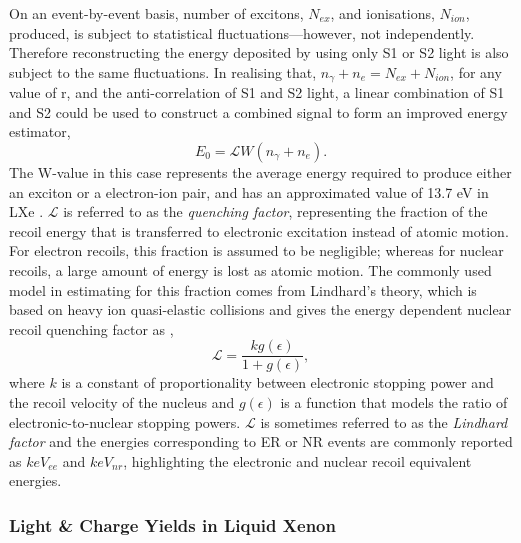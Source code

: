 On an event-by-event basis, number of excitons, $N_{ex}$, and ionisations, $N_{ion}$, produced, is subject to statistical fluctuations---however, not independently. Therefore reconstructing the energy deposited by using only S1 or S2 light is also subject to the same fluctuations. In realising that, $ n_{\gamma} + n_{e} = N_{ex} + N_{ion}$, for any value of r, and the anti-correlation of S1 and S2 light, a linear combination of S1 and S2 could be used to construct a combined signal to form an improved energy estimator,
%
\begin{equation} \label{eq:combined_energy}
    E_{0} = \mathcal{L}W(n_{\gamma} + n_{e}). 
\end{equation}
%
The W-value in this case represents the average energy required to produce either an exciton or a electron-ion pair, and has an approximated value of 13.7 eV in LXe \cite{Dahl}. $\mathcal{L}$ is referred to as the \textit{quenching factor}, representing the fraction of the recoil energy that is transferred to electronic excitation instead of atomic motion. For electron recoils, this fraction is assumed to be negligible; whereas for nuclear recoils, a large amount of energy is lost as atomic motion. The commonly used model in estimating for this fraction comes from Lindhard’s theory, which is based on heavy ion quasi-elastic collisions and gives the energy dependent nuclear recoil quenching factor as \cite{Lindhard, Lindhard_2},
%
\begin{equation} \label{eq:combined_energy}
    \mathcal{L} = \frac{kg(\epsilon)}{1 + g(\epsilon)},
\end{equation}
%
where $k$ is a constant of proportionality between electronic stopping power and the recoil velocity of the nucleus and $g(\epsilon)$ is a function that models the ratio of electronic-to-nuclear stopping powers. $\mathcal{L}$ is sometimes referred to as the \textit{Lindhard factor} and the energies corresponding to ER or NR events are commonly reported as $keV_{ee}$ and $keV_{nr}$, highlighting the electronic and nuclear recoil equivalent energies.

\subsubsection{Light \& Charge Yields in Liquid Xenon}
\label{subsubsec:light_charge}

